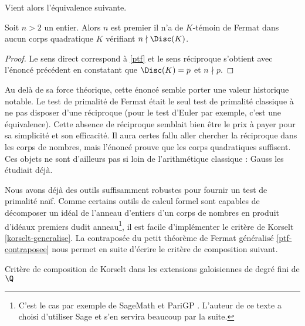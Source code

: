 Vient alors l'équivalence suivante.

\begin{theoreme}\label{ptf-equivalence}
	Soit $n>2$ un entier. Alors $n$ est premier \ssi il n'a de $K$-témoin de Fermat dans aucun corps quadratique $K$ vérifiant $n\nmid \Disc(K)$.
\end{theoreme}

\begin{proof}
	Le sens direct correspond à \ref{ptf} et le sens réciproque s'obtient avec l'énoncé précédent en constatant que $\Disc(K) = p$ et $n\nmid p$.
\end{proof}

\begin{remarque}
Au delà de sa force théorique, cette énoncé semble porter une valeur historique notable. Le test de primalité de Fermat était le seul test de primalité classique à ne pas disposer d'une réciproque (pour le test d'Euler par exemple, c'est une équivalence). Cette absence de réciproque semblait bien être le prix à payer pour sa simplicité et son efficacité. Il aura certes fallu aller chercher la réciproque dans les corps de nombres, mais l'énoncé prouve que les corps quadratiques suffisent. Ces objets ne sont d'ailleurs pas si loin de l'arithmétique classique : Gauss les étudiait déjà.
\end{remarque}

Nous avons déjà des outils suffisamment robustes pour fournir un test de primalité naïf. Comme certains outils de calcul formel sont capables de décomposer un idéal de l'anneau d'entiers d'un corps de nombres en produit d'idéaux premiers dudit anneau\footnote{C'est le cas par exemple de SageMath et PariGP . L'auteur de ce texte a choisi d'utiliser Sage et s'en servira beaucoup par la suite.}, il est facile d'implémenter le critère de Korselt \ref{korselt-generalise}. La contraposée du petit théorème de Fermat généralisé \ref{ptf-contraposee} nous permet en suite d'écrire le critère de composition suivant.

\vspace{1em}
\begin{algorithm}[H]\label{test-primalite-korselt}
\caption{Critère de composition de Korselt dans les extensions galoisiennes de degré fini de $\Q$}
\end{algorithm}
\vspace{1em}

